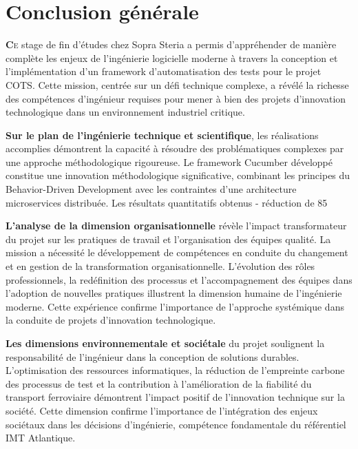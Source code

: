 
\chapter*{Conclusion générale}

\lettrine{\textbf{C}}\lowercase{e} stage de fin d'études chez Sopra Steria a permis d'appréhender de manière complète les enjeux de l'ingénierie logicielle moderne à travers la conception et l'implémentation d'un framework d'automatisation des tests pour le projet COTS. Cette mission, centrée sur un défi technique complexe, a révélé la richesse des compétences d'ingénieur requises pour mener à bien des projets d'innovation technologique dans un environnement industriel critique.

\textbf{Sur le plan de l'ingénierie technique et scientifique}, les réalisations accomplies démontrent la capacité à résoudre des problématiques complexes par une approche méthodologique rigoureuse. Le framework Cucumber développé constitue une innovation méthodologique significative, combinant les principes du Behavior-Driven Development avec les contraintes d'une architecture microservices distribuée. Les résultats quantitatifs obtenus - réduction de 85%

\textbf{L'analyse de la dimension organisationnelle} révèle l'impact transformateur du projet sur les pratiques de travail et l'organisation des équipes qualité. La mission a nécessité le développement de compétences en conduite du changement et en gestion de la transformation organisationnelle. L'évolution des rôles professionnels, la redéfinition des processus et l'accompagnement des équipes dans l'adoption de nouvelles pratiques illustrent la dimension humaine de l'ingénierie moderne. Cette expérience confirme l'importance de l'approche systémique dans la conduite de projets d'innovation technologique.

\textbf{Les dimensions environnementale et sociétale} du projet soulignent la responsabilité de l'ingénieur dans la conception de solutions durables. L'optimisation des ressources informatiques, la réduction de l'empreinte carbone des processus de test et la contribution à l'amélioration de la fiabilité du transport ferroviaire démontrent l'impact positif de l'innovation technique sur la société. Cette dimension confirme l'importance de l'intégration des enjeux sociétaux dans les décisions d'ingénierie, compétence fondamentale du référentiel IMT Atlantique.

